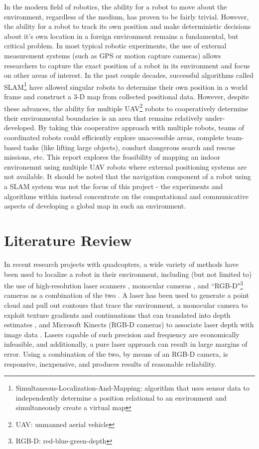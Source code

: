 \documentclass[letterpaper, oneside, 10pt]{report}
\begin{document}
In the modern field of robotics, the ability for a robot to move about the environment, regardless of the medium, has proven to be fairly trivial. However, the ability for a robot to track its own position and make deterministic decisions about it's own location in a foreign environment remains a fundamental, but critical problem. In most typical robotic experiments, the use of external measurement systems (such as GPS or motion capture cameras) allows researchers to capture the exact position of a robot in its environment and focus on other areas of interest. In the past couple decades, successful algorithms called SLAM\footnote{Simultaneous-Localization-And-Mapping: algorithm that uses sensor data to independently determine a position relational to an environment and simultaneously create a virtual map} have allowed singular robots to determine their own position in a world frame and construct a 3-D map from collected positional data. However, despite these advances, the ability for multiple UAV\footnote{UAV: unmanned aerial vehicle} robots to cooperatively determine their environmental boundaries is an area that remains relatively under-developed. By taking this cooperative approach with multiple robots, teams of coordinated robots could efficiently explore unaccessible areas, complete team-based tasks (like lifting large objects), conduct dangerous search and rescue missions, etc. This report explores the feasibility of mapping an indoor environemnt using multiple UAV robots where external positioning systems are not available. It should be noted that the navigation component of a robot using a SLAM system was not the focus of this project - the experiments and algorithms within instead concentrate on the computational and communicative aspects of developing a global map in such an environment.

\section{Literature Review}

In recent research projects with quadcopters, a wide variety of methods have been used to localize a robot in their environment, including (but not limited to) the use of high-resolution laser scanners \cite{bachrach2011range,shen2011autonomous}, monocular cameras \cite{soundararaj2009autonomous}, and ``RGB-D"\footnote{RGB-D: red-blue-green-depth} cameras as a combination of the two \cite{huang2011visual}. A laser has been used to generate a point cloud and pull out contours that trace the environment\cite{bachrach2011range}, a monocular camera to exploit texture gradients and continuations that can translated into depth estimates \cite{soundararaj2009autonomous}, and Microsoft Kinects (RGB-D cameras) to associate laser depth with image data \cite{huang2011visual}. Lasers capable of such precision and frequency are economically infeasible, and additionally, a pure laser approach can result in large margins of error. Using a combination of the two, by means of an RGB-D camera, is responsive, inexpensive, and produces results of reasonable reliability.
\end{document}
